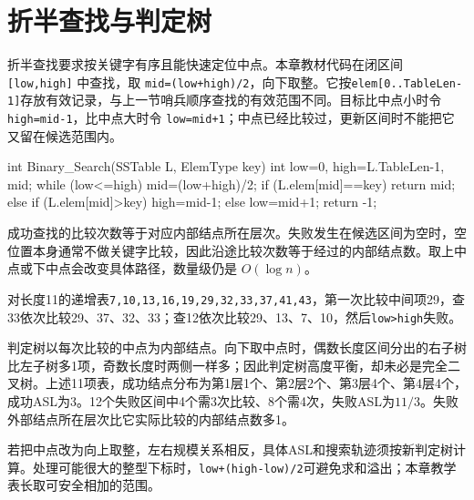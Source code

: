 \section{折半查找与判定树}\label{DS07-03}

折半查找要求按关键字有序且能快速定位中点。本章教材代码在闭区间 \texttt{[\allowbreak{}low,\allowbreak{}high]\allowbreak{}} 中查找，取 \texttt{mid=\allowbreak{}(\allowbreak{}low+\allowbreak{}high)\allowbreak{}/\allowbreak{}2}，向下取整。它按\texttt{elem[\allowbreak{}0.\allowbreak{}.\allowbreak{}TableLen-1]\allowbreak{}}存放有效记录，与上一节哨兵顺序查找的有效范围不同。目标比中点小时令 \texttt{high=\allowbreak{}mid-1}，比中点大时令 \texttt{low=\allowbreak{}mid+\allowbreak{}1}；中点已经比较过，更新区间时不能把它又留在候选范围内。

\par\medskip\noindent\begin{minipage}{\linewidth}
\begin{codeblock}[language=C++]
int Binary_Search(SSTable L, ElemType key) {
    int low=0, high=L.TableLen-1, mid;
    while (low<=high) {
        mid=(low+high)/2;
        if (L.elem[mid]==key) return mid;
        else if (L.elem[mid]>key) high=mid-1;
        else low=mid+1;
    }
    return -1;
}
\end{codeblock}
\end{minipage}\par\medskip

成功查找的比较次数等于对应内部结点所在层次。失败发生在候选区间为空时，空位置本身通常不做关键字比较，因此沿途比较次数等于经过的内部结点数。取上中点或下中点会改变具体路径，数量级仍是 \(O(\log n)\)。

对长度11的递增表\texttt{7,\allowbreak{}10,\allowbreak{}13,\allowbreak{}16,\allowbreak{}19,\allowbreak{}29,\allowbreak{}32,\allowbreak{}33,\allowbreak{}37,\allowbreak{}41,\allowbreak{}43}，第一次比较中间项29，查33依次比较29、37、32、33；查12依次比较29、13、7、10，然后\texttt{low>\allowbreak{}high}失败。

判定树以每次比较的中点为内部结点。向下取中点时，偶数长度区间分出的右子树比左子树多1项，奇数长度时两侧一样多；因此判定树高度平衡，却未必是完全二叉树。上述11项表，成功结点分布为第1层1个、第2层2个、第3层4个、第4层4个，成功ASL为3。12个失败区间中4个需3次比较、8个需4次，失败ASL为\(11/3\)。失败外部结点所在层次比它实际比较的内部结点数多1。

若把中点改为向上取整，左右规模关系相反，具体ASL和搜索轨迹须按新判定树计算。处理可能很大的整型下标时，\texttt{low+\allowbreak{}(\allowbreak{}high-low)\allowbreak{}/\allowbreak{}2}可避免求和溢出；本章教学表长取可安全相加的范围。

